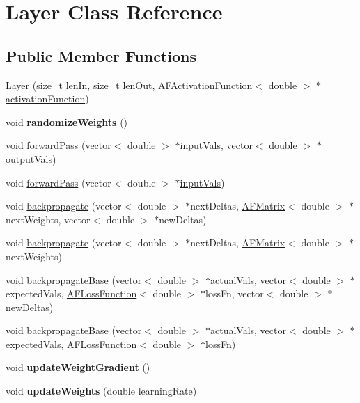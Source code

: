 \hypertarget{classLayer}{}\section{Layer Class Reference}
\label{classLayer}
\subsection*{Public Member Functions}
\begin{DoxyCompactItemize}
\item 
\hyperlink{classLayer_ac7b74e6fa9a90f78753c0318cf731719}{Layer} (size\+\_\+t \hyperlink{classLayer_a5f699c67410ebc5acad98cc5d3a9b5ec}{len\+In}, size\+\_\+t \hyperlink{classLayer_a57aa9a6491ea690f338f145c62a582f2}{len\+Out}, \hyperlink{classAFActivationFunction}{A\+F\+Activation\+Function}$<$ double $>$ $\ast$\hyperlink{classLayer_abe40a67ce33b17440ff6b0571b0c49e5}{activation\+Function})
\item 
\mbox{\label{classLayer_ab725324396c041488c108238e0c23037}} 
void {\bfseries randomize\+Weights} ()
\item 
void \hyperlink{classLayer_ad8fbfc2d20832ea5f8174074f26aaba1}{forward\+Pass} (vector$<$ double $>$ $\ast$\hyperlink{classLayer_ab72e6e0db19cd376c3c62b59e5f55e56}{input\+Vals}, vector$<$ double $>$ $\ast$\hyperlink{classLayer_a42731a44d761c086b0c4914fcc2ba8a0}{output\+Vals})
\item 
void \hyperlink{classLayer_ac447454d60f91693dc98020f0063da5a}{forward\+Pass} (vector$<$ double $>$ $\ast$\hyperlink{classLayer_ab72e6e0db19cd376c3c62b59e5f55e56}{input\+Vals})
\item 
void \hyperlink{classLayer_a5fa93a13d02fe9ee536d87b4980c8862}{backpropagate} (vector$<$ double $>$ $\ast$next\+Deltas, \hyperlink{classAFMatrix}{A\+F\+Matrix}$<$ double $>$ $\ast$next\+Weights, vector$<$ double $>$ $\ast$new\+Deltas)
\item 
void \hyperlink{classLayer_ab971a401b617ae20c5ab19310be25a70}{backpropagate} (vector$<$ double $>$ $\ast$next\+Deltas, \hyperlink{classAFMatrix}{A\+F\+Matrix}$<$ double $>$ $\ast$next\+Weights)
\item 
void \hyperlink{classLayer_a662f96aaa0e56564046baf34d4afddf5}{backpropagate\+Base} (vector$<$ double $>$ $\ast$actual\+Vals, vector$<$ double $>$ $\ast$expected\+Vals, \hyperlink{classAFLossFunction}{A\+F\+Loss\+Function}$<$ double $>$ $\ast$loss\+Fn, vector$<$ double $>$ $\ast$new\+Deltas)
\item 
void \hyperlink{classLayer_af2181f3eda8a8c6898d47fc3c280313b}{backpropagate\+Base} (vector$<$ double $>$ $\ast$actual\+Vals, vector$<$ double $>$ $\ast$expected\+Vals, \hyperlink{classAFLossFunction}{A\+F\+Loss\+Function}$<$ double $>$ $\ast$loss\+Fn)
\item 
\mbox{\label{classLayer_a6896bb337eee9d535030fe115e4951ef}} 
void {\bfseries update\+Weight\+Gradient} ()
\item 
\mbox{\label{classLayer_a9617331c069ebe2a8f20fd72aa017717}} 
void {\bfseries update\+Weights} (double learning\+Rate)
\end{DoxyCompactItemize}
